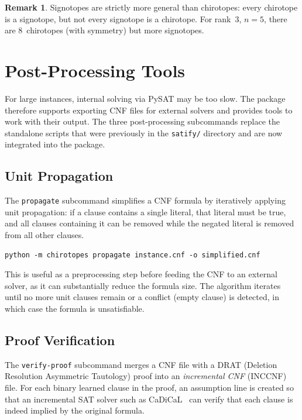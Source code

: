 \documentclass[11pt]{article}
\theoremstyle{definition}
\newtheorem{remark}{Remark}
\begin{document}
\begin{remark}
Signotopes are strictly more general than chirotopes: every chirotope is a signotope, but not every signotope is a chirotope. For rank~3, $n=5$, there are 8~chirotopes (with symmetry) but more signotopes.
\end{remark}

\section{Post-Processing Tools}
\label{sec:postprocessing}

For large instances, internal solving via PySAT may be too slow. The package therefore supports exporting CNF files for external solvers and provides tools to work with their output. The three post-processing subcommands replace the standalone scripts that were previously in the \texttt{satify/} directory and are now integrated into the package.

\subsection{Unit Propagation}

The \texttt{propagate} subcommand simplifies a CNF formula by iteratively applying unit propagation: if a clause contains a single literal, that literal must be true, and all clauses containing it can be removed while the negated literal is removed from all other clauses.

\begin{lstlisting}
python -m chirotopes propagate instance.cnf -o simplified.cnf
\end{lstlisting}

This is useful as a preprocessing step before feeding the CNF to an external solver, as it can substantially reduce the formula size. The algorithm iterates until no more unit clauses remain or a conflict (empty clause) is detected, in which case the formula is unsatisfiable.

\subsection{Proof Verification}

The \texttt{verify-proof} subcommand merges a CNF file with a DRAT (Deletion Resolution Asymmetric Tautology) proof into an \emph{incremental CNF} (INCCNF) file. For each binary learned clause in the proof, an assumption line is created so that an incremental SAT solver such as CaDiCaL~\cite{Biere2019} can verify that each clause is indeed implied by the original formula.
\end{document}
